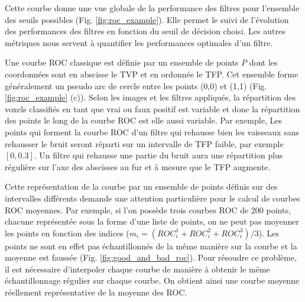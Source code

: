 Cette courbe donne une vue globale de la performance des filtres pour l'ensemble des seuils possibles (Fig. \ref{fig:roc_example}). Elle permet le suivi de l'évolution des performances des filtres en fonction du seuil de décision choisi. Les autres métriques nous servent à quantifier les performances optimales d'un filtre. 

Une courbe ROC classique est définie par un ensemble de points $P$ dont les coordonnées sont en abscisse le TVP et en ordonnée le TFP. Cet ensemble forme généralement un pseudo arc de cercle entre les points (0,0) et (1,1) (Fig. \ref{fig:roc_example} (c)). Selon les images et les filtres appliqués, la répartition des voxels classifiés en tant que vrai ou faux positif est variable et donc la répartition des points le long de la courbe ROC est elle aussi variable. Par exemple, Les points qui forment la courbe ROC d'un filtre qui rehausse bien les vaisseaux sans rehausser le bruit seront réparti sur un intervalle de TFP faible, par exemple $[0,0.3]$. Un filtre qui rehausse une partie du bruit aura une répartition plus régulière sur l'axe des abscisses au fur et à mesure que le TFP augmente. 

Cette représentation de la courbe par un ensemble de points définis sur des intervalles différents demande une attention particulière pour le calcul de courbes ROC moyennes. Par exemple, si l'on possède trois courbes ROC de 200 points, chacune représentée sous la forme d'une liste de points, on ne peut pas moyenner les points en fonction des indices ($m_i = (ROC^1_{i} + ROC^2_{i} + ROC^3_{i})/3 $). Les points ne sont en effet pas échantillonnés de la même manière sur la courbe et la moyenne est faussée (Fig. \ref{fig:good_and_bad_roc}). Pour résoudre ce problème, il est nécessaire d'interpoler chaque courbe de manière à obtenir le même échantillonnage régulier sur chaque courbe. On obtient ainsi une courbe moyenne réellement représentative de la moyenne des ROC.

